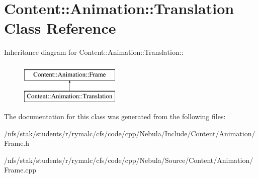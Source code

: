 \hypertarget{classContent_1_1Animation_1_1Translation}{
\section{Content::Animation::Translation Class Reference}
\label{classContent_1_1Animation_1_1Translation}
}
Inheritance diagram for Content::Animation::Translation::\begin{figure}[H]
\begin{center}
\leavevmode
\includegraphics[height=2cm]{classContent_1_1Animation_1_1Translation}
\end{center}
\end{figure}


The documentation for this class was generated from the following files:\begin{DoxyCompactItemize}
\item 
/nfs/stak/students/r/rymalc/cfs/code/cpp/Nebula/Include/Content/Animation/Frame.h\item 
/nfs/stak/students/r/rymalc/cfs/code/cpp/Nebula/Source/Content/Animation/Frame.cpp\end{DoxyCompactItemize}
